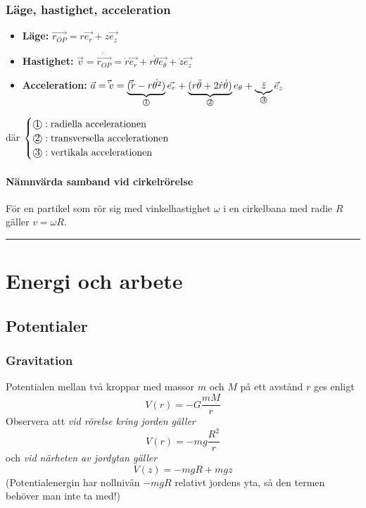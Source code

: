 \documentclass{article}
\newenvironment{ankiflashcard}[1][ ]{}{}
\newcommand{\ruler}{
\rule{0.5\textwidth}{0.5pt}
}
\newcommand{\numbercircle}[1]{
\text{\textcircled{#1}}
}
\newcommand{\numbercirclewithunderbrace}[2]{
\underbrace{#1}_{\numbercircle{#2}}
}
\begin{document}
\begin{paracol}{2}
\subsubsection{Läge, hastighet, acceleration}
\begin{itemize}
    \item \textbf{Läge:} $\vec{r_{OP}}=r \vec{e_r}+z\vec{e_z}$
    \item \textbf{Hastighet:} $\vec v = \dot \vec{r_{OP}}=\dot r \vec{e_r} + r\dot \theta \vec{e_\theta}+\dot z\vec{e_z}$
    \item \textbf{Acceleration:} $\vec a = \vec \dot v = \numbercirclewithunderbrace{(\vec \ddot r- r\dot{\theta^2})}{1}\vec{e_r}
    +\numbercirclewithunderbrace{(r\ddot \theta + 2\dot r\dot \theta)}{2}e_\theta +\numbercirclewithunderbrace{\ddot z}{3} \vec e_z$
\end{itemize}
där $\begin{cases}
\numbercircle{1}:\space\text{radiella accelerationen}\\
\numbercircle{2}:\space\text{transversella accelerationen}\\
\numbercircle{3}:\space\text{vertikala accelerationen}
\end{cases}$


\paragraph{Nämnvärda samband vid cirkelrörelse}


För en partikel som rör sig med vinkelhastighet $\omega$ i en cirkelbana med radie $R$ gäller $v=\omega R$.


\ruler
\section{Energi och arbete}
\subsection{Potentialer}

\begin{ankiflashcard}
    
\subsubsection{Gravitation}
Potentialen mellan två kroppar med massor $m$ och $M$ på ett avstånd $r$ ges enligt
$$
V(r)=-G\frac{mM}{r}
$$
Observera att \textit{vid rörelse kring jorden gäller}
$$
V(r)=-mg\frac{R^2}{r}
$$
och \textit{vid närheten av jordytan gäller}
$$
V(z)=-mgR+mgz
$$
(Potentialenergin har nollnivån $-mgR$ relativt jordens yta, så den termen behöver man inte ta med!)
\end{ankiflashcard}


\end{paracol}
\end{document}
